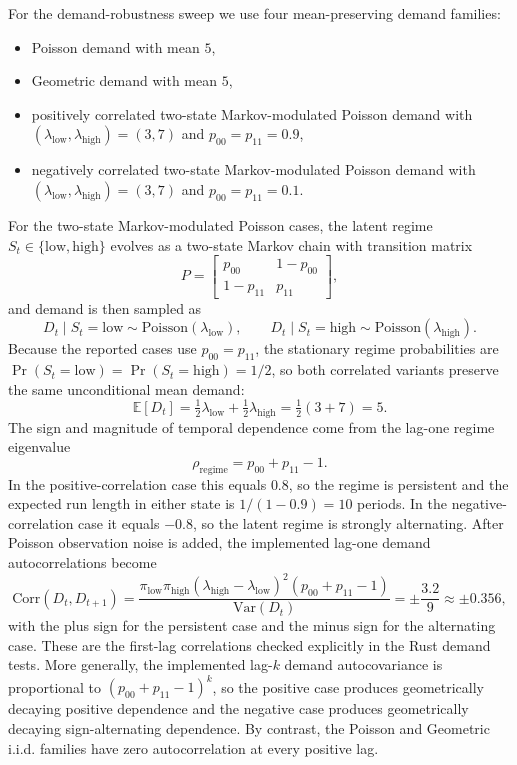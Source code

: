 \documentclass[11pt]{article}
\begin{document}
For the demand-robustness sweep we use four mean-preserving demand families:
\begin{itemize}
    \item Poisson demand with mean $5$,
    \item Geometric demand with mean $5$,
    \item positively correlated two-state Markov-modulated Poisson demand with
    $(\lambda_{\mathrm{low}}, \lambda_{\mathrm{high}})=(3,7)$ and $p_{00}=p_{11}=0.9$,
    \item negatively correlated two-state Markov-modulated Poisson demand with
    $(\lambda_{\mathrm{low}}, \lambda_{\mathrm{high}})=(3,7)$ and $p_{00}=p_{11}=0.1$.
\end{itemize}

For the two-state Markov-modulated Poisson cases, the latent regime $S_t \in \{\mathrm{low},
\mathrm{high}\}$ evolves as a two-state Markov chain with transition matrix
\[
P =
\begin{bmatrix}
p_{00} & 1-p_{00} \\
1-p_{11} & p_{11}
\end{bmatrix},
\]
and demand is then sampled as
\[
D_t \mid S_t=\mathrm{low} \sim \mathrm{Poisson}(\lambda_{\mathrm{low}}),
\qquad
D_t \mid S_t=\mathrm{high} \sim \mathrm{Poisson}(\lambda_{\mathrm{high}}).
\]
Because the reported cases use $p_{00}=p_{11}$, the stationary regime probabilities are
$\Pr(S_t=\mathrm{low})=\Pr(S_t=\mathrm{high})=1/2$, so both correlated variants preserve the same
unconditional mean demand:
\[
\mathbb{E}[D_t] = \tfrac{1}{2}\lambda_{\mathrm{low}} + \tfrac{1}{2}\lambda_{\mathrm{high}}
= \tfrac{1}{2}(3+7)=5.
\]
The sign and magnitude of temporal dependence come from the lag-one regime eigenvalue
\[
\rho_{\mathrm{regime}} = p_{00}+p_{11}-1.
\]
In the positive-correlation case this equals $0.8$, so the regime is persistent and the expected
run length in either state is $1/(1-0.9)=10$ periods. In the negative-correlation case it equals
$-0.8$, so the latent regime is strongly alternating. After Poisson observation noise is added,
the implemented lag-one demand autocorrelations become
\[
\mathrm{Corr}(D_t,D_{t+1})
= \frac{\pi_{\mathrm{low}}\pi_{\mathrm{high}}(\lambda_{\mathrm{high}}-\lambda_{\mathrm{low}})^2
(p_{00}+p_{11}-1)}{\mathrm{Var}(D_t)}
= \pm \frac{3.2}{9}
\approx \pm 0.356,
\]
with the plus sign for the persistent case and the minus sign for the alternating case. These are
the first-lag correlations checked explicitly in the Rust demand tests. More generally, the
implemented lag-$k$ demand autocovariance is proportional to $(p_{00}+p_{11}-1)^k$, so the
positive case produces geometrically decaying positive dependence and the negative case produces
geometrically decaying sign-alternating dependence. By contrast, the Poisson and Geometric i.i.d.
families have zero autocorrelation at every positive lag.
\end{document}

